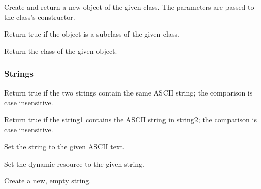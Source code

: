 \begin{leftlines}
\end{leftlines}

Create and return a new object of the given class.  The parameters are
passed to the class's constructor.

\begin{leftlines}
\end{leftlines}

Return true if the object is a subclass of the given class.

\begin{leftlines}
\end{leftlines}

Return the class of the given object.


\subsubsection{Strings}

\begin{leftlines}
\end{leftlines}

Return true if the two strings contain the same ASCII string; the
comparison is case insensitive.

\begin{leftlines}
\end{leftlines}

Return true if the string1 contains the ASCII string in string2; the
comparison is case insensitive.

\begin{leftlines}
\end{leftlines}

Set the string to the given ASCII text.

\begin{leftlines}
\end{leftlines}

Set the dynamic resource to the given string.

\begin{leftlines}
\end{leftlines}

Create a new, empty string.

